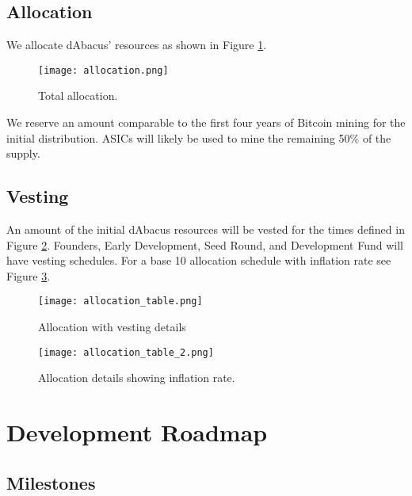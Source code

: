 \documentclass[12pt]{article}
\begin{document}
\subsection{Allocation}

We allocate dAbacus' resources as shown in Figure \ref{fig:allocation}. 

\begin{figure}[h!]
\centering
  \texttt{[image: allocation.png]}
  \caption{Total allocation.}
  \label{fig:allocation}
\end{figure}

We reserve an amount comparable to the first four years of Bitcoin mining for the initial distribution.  ASICs will likely be used to mine the remaining 50\% of the supply.



\subsection{Vesting}

An amount of the initial dAbacus resources will be vested for the times defined in Figure \ref{fig:allocation_table}. Founders, Early Development, Seed Round, and Development Fund will have vesting schedules. For a base 10 allocation schedule with inflation rate see Figure \ref{fig:allocation_table2}.







\begin{figure}[H]
\centering
  \texttt{[image: allocation\_table.png]}
  \caption{Allocation with vesting details}
  \label{fig:allocation_table}
\end{figure}

 \thispagestyle{empty} 

\begin{figure}[H]
\centering
  \texttt{[image: allocation\_table\_2.png]}
  \caption{Allocation details showing inflation rate.}
  \label{fig:allocation_table2}
\end{figure}
 \thispagestyle{empty} 






\section{Development Roadmap}


\subsection{Milestones}
\end{document}
